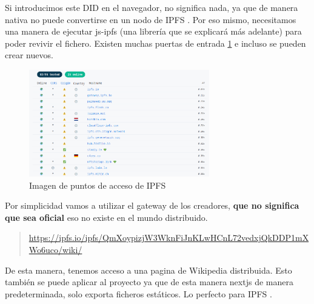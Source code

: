 Si introducimos este DID en el navegador, no significa nada, ya que de manera nativa no puede convertirse en un nodo de IPFS \cite{web:ipfs}. Por eso mismo, necesitamos una manera de ejecutar js-ipfs \cite{web:js-ipfs} (una librería que se explicará más adelante) para poder revivir el fichero.
Existen muchas puertas de entrada \ref{fg:ipfs_entry} e incluso se pueden crear nuevos.
\begin{figure}[h!]
    \centering
    \includegraphics[width=0.7\textwidth]{Figures/ipfs_entry.png}
    \caption{Imagen de puntos de acceso de IPFS \cite{web:ipfs}}
    \label{fg:ipfs_entry}
\end{figure}
Por simplicidad vamos a utilizar el gateway de los creadores, \textbf{que no significa que sea oficial} eso no existe en el mundo distribuido.
\begin{quote}
    \url{https://ipfs.io/ipfs/QmXoypizjW3WknFiJnKLwHCnL72vedxjQkDDP1mXWo6uco/wiki/}
\end{quote}
De esta manera, tenemos acceso a una pagina de Wikipedia distribuida.
Esto también se puede aplicar al proyecto ya que de esta manera nextjs de manera predeterminada, solo exporta ficheros estáticos. Lo perfecto para IPFS \cite{web:ipfs}.
